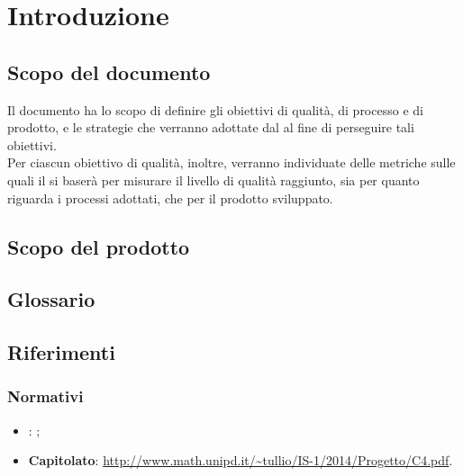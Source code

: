 \section{Introduzione}
\subsection{Scopo del documento}
Il documento ha lo scopo di definire gli obiettivi di qualità, di processo e di prodotto, e le strategie che verranno adottate dal  al fine di perseguire tali obiettivi.\\
Per ciascun obiettivo di qualità, inoltre, verranno individuate delle metriche sulle quali il  si baserà per misurare il livello di qualità raggiunto, sia per quanto riguarda i processi adottati, che per il prodotto sviluppato.
\subsection{Scopo del prodotto}
\scopoProdotto
\subsection{Glossario}
\descrizioneGlossario
\subsection{Riferimenti}
\subsubsection{Normativi}
\begin{itemize}
\item \textbf{\NP}: \normeDiProgetto;
\item \textbf{Capitolato}: \url{http://www.math.unipd.it/~tullio/IS-1/2014/Progetto/C4.pdf}.
\end{itemize}
